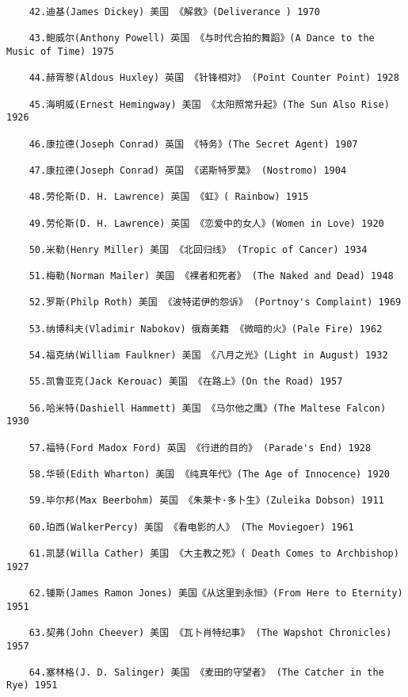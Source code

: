 \documentclass[UTF8]{../RepresentationUniverse}
\begin{document}
\begin{lstlisting}
    42.迪基(James Dickey) 美国 《解救》(Deliverance ) 1970
    
    43.鲍威尔(Anthony Powell) 英国 《与时代合拍的舞蹈》(A Dance to the Music of Time) 1975
    
    44.赫胥黎(Aldous Huxley) 英国 《针锋相对》 (Point Counter Point) 1928
    
    45.海明威(Ernest Hemingway) 美国 《太阳照常升起》(The Sun Also Rise) 1926
    
    46.康拉德(Joseph Conrad) 英国 《特务》(The Secret Agent) 1907
    
    47.康拉德(Joseph Conrad) 英国 《诺斯特罗莫》 (Nostromo) 1904
    
    48.劳伦斯(D. H. Lawrence) 英国 《虹》( Rainbow) 1915
    
    49.劳伦斯(D. H. Lawrence) 英国 《恋爱中的女人》(Women in Love) 1920
    
    50.米勒(Henry Miller) 美国 《北回归线》 (Tropic of Cancer) 1934
    
    51.梅勒(Norman Mailer) 美国 《裸者和死者》 (The Naked and Dead) 1948
    
    52.罗斯(Philp Roth) 美国 《波特诺伊的怨诉》 (Portnoy's Complaint) 1969
    
    53.纳博科夫(Vladimir Nabokov) 俄裔美籍 《微暗的火》(Pale Fire) 1962
    
    54.福克纳(William Faulkner) 美国 《八月之光》(Light in August) 1932
    
    55.凯鲁亚克(Jack Kerouac) 美国 《在路上》(On the Road) 1957
    
    56.哈米特(Dashiell Hammett) 美国 《马尔他之鹰》(The Maltese Falcon) 1930
    
    57.福特(Ford Madox Ford) 英国 《行进的目的》 (Parade's End) 1928
    
    58.华顿(Edith Wharton) 美国 《纯真年代》(The Age of Innocence) 1920
    
    59.毕尔邦(Max Beerbohm) 英国 《朱莱卡·多卜生》(Zuleika Dobson) 1911
    
    60.珀西(WalkerPercy) 美国 《看电影的人》 (The Moviegoer) 1961
    
    61.凯瑟(Willa Cather) 美国 《大主教之死》( Death Comes to Archbishop) 1927
    
    62.锺斯(James Ramon Jones) 美国《从这里到永恒》(From Here to Eternity) 1951
    
    63.契弗(John Cheever) 美国 《瓦卜肖特纪事》 (The Wapshot Chronicles) 1957
    
    64.塞林格(J. D. Salinger) 美国 《麦田的守望者》 (The Catcher in the Rye) 1951
    

\end{lstlisting}
\end{document}
